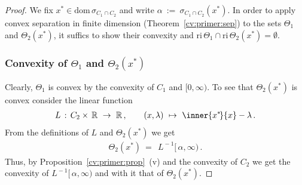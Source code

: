 \begin{proof}
  We fix 
  $ x^* \in \mathrm{dom}\, \sigma_{C_1\cap C_2} $
  and write
  $ 
  \alpha
  \ 
  :=
  \ 
  \sigma_{C_1\cap C_2}(x^*)
  $.
  In order to apply convex separation in finite dimension 
  (Theorem~\ref{cv:primer:sep})
  to
  the sets
  $ \Theta_1 $ and $ \Theta_2(x^*) $,
  it suffics to show
  their convexity and
  $
    \mathrm{ri}\, 
    \Theta_1
    \cap
    \mathrm{ri}\, 
    \Theta_2(x^*)
    =
    \emptyset
  $.
  \subsubsection*{Convexity of 
  $ \Theta_1 $ and $ \Theta_2(x^*) $
  }
  Clearly, 
  $ \Theta_1 $ is convex by the convexity of 
  $ C_1 $ and $ [0,\infty) $.
 To see that $\Theta_2(x^*)$ is convex consider the linear function
 \begin{gather*}
    L
    \,
    :
    \,
    C_2\times\,  \R 
    \ 
    \to
    \ 
    \R
    \,,
    \qquad 
    (x,\lambda)
    \ 
    \mapsto
    \ 
    \inner{x^*\!}{x} - \lambda
    \,.
 \end{gather*}
 From the definitions of $L$ and $\Theta_2(x^*)$ we get 
  \begin{gather*}
 \Theta_2
 (x^*)
    \ 
    =
    \ 
    \ 
    L^{\!-1}
    [\,\alpha,\infty)
    \,
    .
  \end{gather*}
  Thus,
  by
  Proposition~\ref{cv:primer:prop}~(v)
  and the convexity of $C_2$ we get the convexity of
  $
    L^{\!-1}
    [\,\alpha,\infty)
  $ and with it that of $\Theta_2(x^*)$.


\end{proof}
